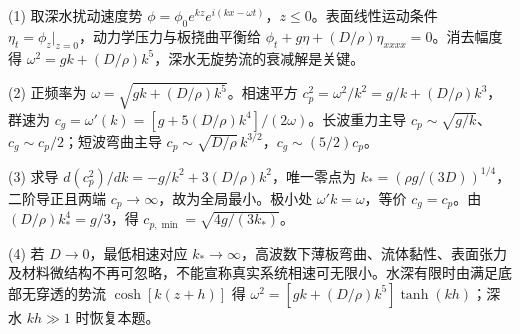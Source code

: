 (1) 取深水扰动速度势 \(\phi=\phi_0e^{kz}e^{i(kx-\omega t)}\)，\(z\le0\)。表面线性运动条件 \(\eta_t=\phi_z|_{z=0}\)，动力学压力与板挠曲平衡给 \(\phi_t+g\eta+(D/\rho)\eta_{xxxx}=0\)。消去幅度得 \(\boxed{\omega^2=gk+(D/\rho)k^5}\)，深水无旋势流的衰减解是关键。

(2) 正频率为 \(\omega=\sqrt{gk+(D/\rho)k^5}\)。相速平方 \(c_p^2=\omega^2/k^2=g/k+(D/\rho)k^3\)，群速为 \(c_g=\omega'(k)=[g+5(D/\rho)k^4]/(2\omega)\)。长波重力主导 \(c_p\sim\sqrt{g/k}\)、\(c_g\sim c_p/2\)；短波弯曲主导 \(c_p\sim\sqrt{D/\rho}\,k^{3/2}\)，\(c_g\sim(5/2)c_p\)。

(3) 求导 \(d(c_p^2)/dk=-g/k^2+3(D/\rho)k^2\)，唯一零点为 \(\boxed{k_*=(\rho g/(3D))^{1/4}}\)，二阶导正且两端 \(c_p\to\infty\)，故为全局最小。极小处 \(\omega'k=\omega\)，等价 \(c_g=c_p\)。由 \((D/\rho)k_*^4=g/3\)，得 \(c_{p,\min}=\sqrt{4g/(3k_*)}\)。

(4) 若 \(D\to0\)，最低相速对应 \(k_*\to\infty\)，高波数下薄板弯曲、流体黏性、表面张力及材料微结构不再可忽略，不能宣称真实系统相速可无限小。水深有限时由满足底部无穿透的势流 \(\cosh[k(z+h)]\) 得 \(\omega^2=[gk+(D/\rho)k^5]\tanh(kh)\)；深水 \(kh\gg1\) 时恢复本题。
